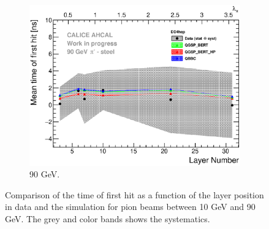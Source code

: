 \begin{figure}[htbp!]
\begin{subfigure}[t]{0.49\textwidth}
    \centering
    \includegraphics[width=1\textwidth]{../Thesis_Plots/Timing/Pions/Plots/ComparisonToSim/Time_Depth_90GeV_DD4hep.eps}
    \caption{90 GeV.} \label{fig:Depth_SimData_90GeV_DD4hep}
  \end{subfigure}
  \caption{Comparison of the time of first hit as a function of the layer position in data and the \ddhep simulation for pion beams between 10 GeV and 90 GeV. The grey and color bands shows the systematics.}
\end{figure}


